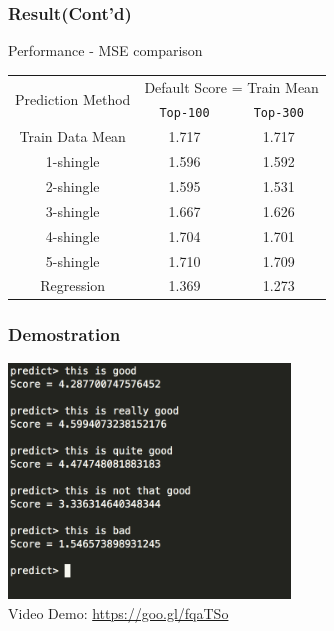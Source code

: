 \documentclass[11pt]{beamer}
\begin{document}
\begin{frame}
\frametitle{Result(Cont'd)}

	\centering
	Performance - MSE comparison

	\begin{center}

		\begin{tabular}{ccc}
			\toprule
				\multirow{2}{*}{Prediction Method} &
				\multicolumn{2}{c}{Default Score = Train Mean}\\
				\cline{2-3}
				& \texttt{Top-100} &  \texttt{Top-300} \\
			\midrule
				Train Data Mean & 1.717 & 1.717 \\
				\hline
				1-shingle & 1.596 & 1.592\\
				2-shingle & 1.595 & 1.531\\
				3-shingle & 1.667 & 1.626\\
				4-shingle & 1.704 & 1.701\\
				5-shingle & 1.710 & 1.709\\
				\hline
				Regression & 1.369 & 1.273\\

			\bottomrule
		\end{tabular}
	\end{center}
	\vspace{5mm}

\end{frame}




\begin{frame}
\frametitle{Demostration}

	\begin{center}
		\includegraphics[width=7.5cm]{demo} \\
		Video Demo: \url{https://goo.gl/fqaTSo}
	\end{center}

\end{frame}
\end{document}
